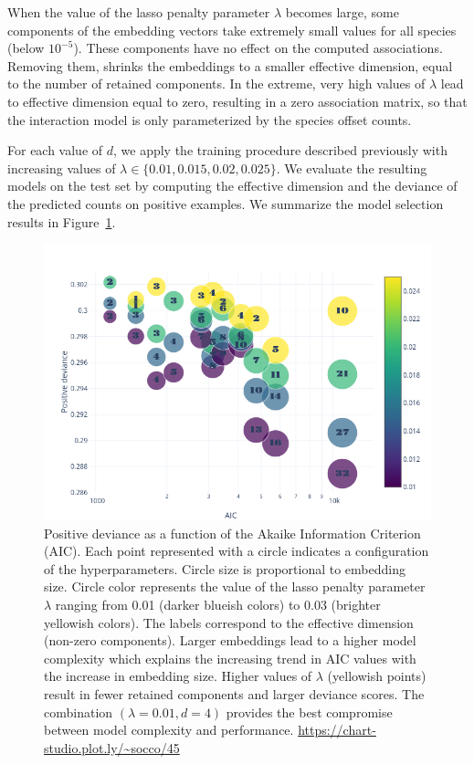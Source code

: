\documentclass[10pt,a4paper]{article}
\begin{document}
When the value of the lasso penalty parameter $\lambda$ becomes large, some components of the embedding vectors take extremely small values for all species (below $10^{-5}$). These components have no effect on the computed associations. Removing them, shrinks the embeddings to a smaller effective dimension, equal to the number of retained components. In the extreme, very high values of $\lambda$ lead to effective dimension equal to zero, resulting in a zero association matrix, so that the interaction model is only parameterized by the species offset counts.

For each value of $d$, we apply the training procedure described previously with increasing values of $\lambda \in \{0.01,0.015,0.02,0.025\}$. We evaluate the resulting models on the test set by computing the effective dimension and the deviance of the predicted counts on positive examples. We summarize the model selection results in Figure~\ref{gridaravo}.

\begin{figure}[bthp]
	\centering
	\includegraphics[scale=0.5]{gridaravo}
	\caption{Positive deviance as a function of the Akaike Information Criterion (AIC). Each point represented with a circle indicates a configuration of the hyperparameters. Circle size is proportional to embedding size. Circle color represents the value of the lasso penalty parameter $\lambda$ ranging from 0.01 (darker blueish colors) to 0.03 (brighter yellowish colors). The labels correspond to the effective dimension (non-zero components). Larger embeddings lead to a higher model complexity which explains the increasing trend in AIC values with the increase in embedding size. Higher values of $\lambda$ (yellowish points) result in fewer retained components and larger deviance scores. The combination $(\lambda=0.01,d=4)$ provides the best compromise between model complexity and performance.  \url{https://chart-studio.plot.ly/~socco/45}}
	\label{gridaravo}
\end{figure}
\end{document}
